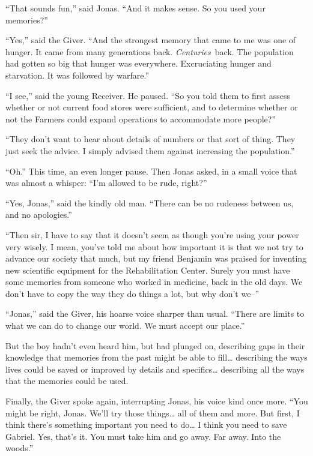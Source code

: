 ``That sounds fun,'' said Jonas. ``And it makes sense. So you used your
memories?''

``Yes,'' said the Giver. ``And the strongest memory that came to me was
one of hunger. It came from many generations back.
\emph{Centuries}~back. The population had gotten so big that hunger was
everywhere. Excruciating hunger and starvation. It was followed by
warfare.''

``I see,'' said the young Receiver. He paused. ``So you told them to
first assess whether or not current food stores were sufficient, and to
determine whether or not the Farmers could expand operations to
accommodate more people?''

``They don't want to hear about details of numbers or that sort of
thing. They just seek the advice. I simply advised them against
increasing the population.''

``Oh.'' This time, an even longer pause. Then Jonas asked, in a small
voice that was almost a whisper: ``I'm allowed to be rude, right?''

``Yes, Jonas,'' said the kindly old man. ``There can be no rudeness
between us, and no apologies.''

``Then sir, I have to say that it doesn't seem as though you're using
your power very wisely. I mean, you've told me about how important it is
that we not try to advance our society that much, but my friend Benjamin
was praised for inventing new scientific equipment for the
Rehabilitation Center. Surely you must have some memories from someone
who worked in medicine, back in the old days. We don't have to copy the
way they do things a lot, but why don't we--''

``Jonas,'' said the Giver, his hoarse voice sharper than usual. ``There
are limits to what we can do to change our world. We must accept our
place.''

But the boy hadn't even heard him, but had plunged on, describing gaps
in their knowledge that memories from the past might be able to
fill\ldots{} describing the ways lives could be saved or improved by
details and specifics\ldots{} describing all the ways that the memories
could be used.

Finally, the Giver spoke again, interrupting Jonas, his voice kind once
more. ``You might be right, Jonas. We'll try those things\ldots{} all of
them and more. But first, I think there's something important you need
to do\ldots{} I think you need to save Gabriel. Yes, that's it. You must
take him and go away. Far away. Into the woods.''

